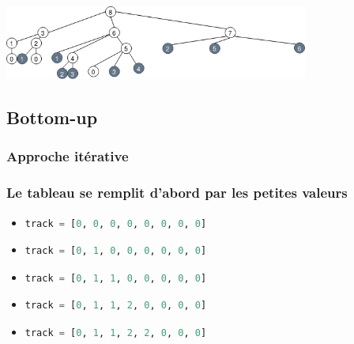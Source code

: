 \documentclass[svgnames,11pt]{beamer}
\begin{document}
\begin{frame}
    \frametitle{}

    \begin{center}
        \centering
        \includegraphics[width=10cm]{ressources/appel-dyn-8.png}
        \label{IMG}
    \end{center}

\end{frame}

\subsection{Bottom-up}
\begin{frame}[fragile]
    \frametitle{Approche itérative}

    \begin{center}
        
        \label{bu}
    \end{center}

\end{frame}
\begin{frame}[fragile]
    \frametitle{Le tableau se remplit d'abord par les petites valeurs}

    \begin{itemize}
        \item<1-> \begin{lstlisting}[language=Python]
track = [0, 0, 0, 0, 0, 0, 0, 0]
        \end{lstlisting}
        \item<2-> \begin{lstlisting}[language=Python]
track = [0, 1, 0, 0, 0, 0, 0, 0]
        \end{lstlisting}
        \item<3-> \begin{lstlisting}[language=Python]
track = [0, 1, 1, 0, 0, 0, 0, 0]
        \end{lstlisting}
        \item<4-> \begin{lstlisting}[language=Python]
track = [0, 1, 1, 2, 0, 0, 0, 0]
        \end{lstlisting}
        \item<5-> \begin{lstlisting}[language=Python]
track = [0, 1, 1, 2, 2, 0, 0, 0]
        \end{lstlisting}
    \end{itemize}

\end{frame}
\end{document}
